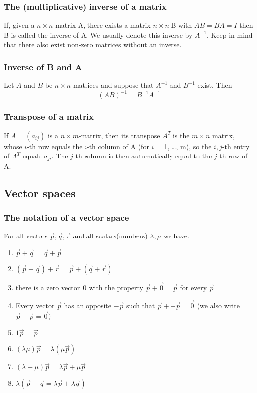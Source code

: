 \documentclass{article}
\begin{document}
			\subsubsection{The (multiplicative) inverse of a matrix}
			If, given a $n\times n$-matrix A, there exists a matrix $n\times n$ B with $AB = BA = I$ then B is called the inverse of A. We usually denote this inverse by $A^{-1}$. Keep in mind that there also exist non-zero matrices without an inverse.
			
			\subsubsection{Inverse of B and A}
			Let $A$ and $B$ be $n \times n$-matrices and suppose that $A^{-1}$ and $B^{-1}$ exist. Then 
			\begin{equation*}
				(AB)^{-1} = B^{-1}A^{-1}
			\end{equation*}
			
			\subsubsection{Transpose of a matrix}
			If $A = (a_{ij})$ is a $n \times m$-matrix, then its transpose $A^T$ is the $m \times n$ matrix, whose $i$-th row equals the $i$-th column of A (for $i$ = 1, \dots, m), so the $i,j$-th entry of $A^T$ equals $a_{ji}$. The $j$-th column is then automatically equal to the $j$-th row of A.
			
		\subsection{Vector spaces}
			\subsubsection{The notation of a vector space}
			For all vectors $\vec{p}, \vec{q}, \vec{r}$ and all scalars(numbers) $\lambda, \mu$ we have.
			\begin{enumerate}
				\item $\vec{p} + \vec{q} = \vec{q} + \vec{p}$
				\item $(\vec{p}+\vec{q}) + \vec{r} = \vec{p} + (\vec{q} + \vec{r})$
				\item there is a zero vector $\vec{0}$ with the property $\vec{p}+\vec{0} = \vec{p}$ for every $\vec{p}$
				\item Every vector $\vec{p}$ has an opposite $-\vec{p}$ such that $\vec{p} + -\vec{p} = \vec{0}$ (we also write $\vec{p} - \vec{p}= \vec{0}$)
				\item $1\vec{p} = \vec{p}$
				\item $(\lambda\mu)\vec{p} = \lambda(\mu\vec{p})$
				\item $(\lambda + \mu)\vec{p} = \lambda\vec{p} + \mu\vec{p}$
				\item $\lambda(\vec{p} + \vec{q} = \lambda\vec{p} + \lambda\vec{q})$
			\end{enumerate}
\end{document}
